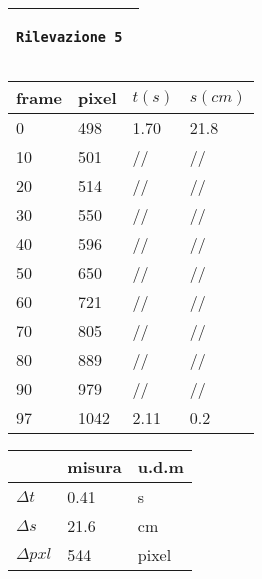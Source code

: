 \documentclass{article}
\begin{document}
\newpage
\begin{center}
\begin{tabular}{|m{15em}|}
	\hline
	
	\begin{center}
		\texttt \bf \large Rilevazione 5
	\end{center} \\
	\hline
\end{tabular}

\vspace{15pt}

\begin{tabular}{ | m{3em} | m{3em} | m{2.5em}| m{2.5em} | } 
 \hline
 \vspace{5pt} frame \vspace{5pt}  &  pixel & $t(s)$ & $s(cm)$\\ 
 \hline
 \hline
 0 & 498 & 1.70 & 21.8\\ 
 \hline
 10 & 501 & //  & //\\
 \hline
 20 & 514 & //  & //\\ 
 \hline
 30 & 550 & //  & //\\ 
 \hline
 40 & 596 & //  & //\\ 
 \hline
 50 & 650 & //  & //\\ 
 \hline
 60 & 721 & //  & //\\ 
 \hline
 70 & 805 & //  & //\\ 
 \hline
 80 & 889 & //  & //\\ 
 \hline
 90 & 979 & //  & //\\ 
 \hline
 97 & 1042 & 2.11  & 0.2\\ 
 \hline
\end{tabular}

\vspace{5pt}

\begin{tabular}{ | m{3em} | m{3em} | m{1cm}| } 
 \hline
   &  misura & u.d.m \\ 
 \hline
 \hline
 $\Delta t$   &  0.41 	& s\\
 \hline
 $\Delta s$   &  21.6	& cm\\
 \hline
 $\Delta pxl$ & 544	& pixel\\
 \hline
\end{tabular}
\end{center}
\end{document}
